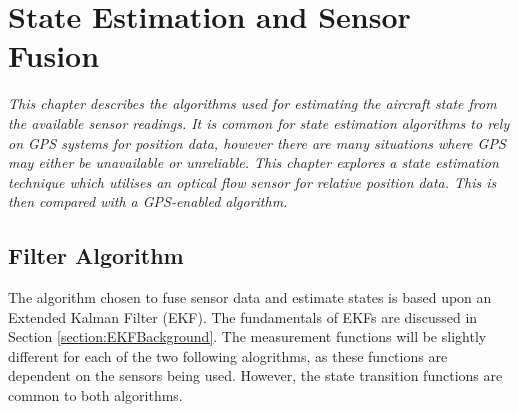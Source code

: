 
\chapter{State Estimation and Sensor Fusion}
\textit{This chapter describes the algorithms used for estimating the aircraft state from the available sensor readings. It is common for state estimation algorithms to rely on GPS systems for position data, however there are many situations where GPS may either be unavailable or unreliable. This chapter explores a state estimation technique which utilises an optical flow sensor for relative position data. This is then compared with a GPS-enabled algorithm.}

\section{Filter Algorithm}\label{section:Filter}
The algorithm chosen to fuse sensor data and estimate states is based upon an Extended Kalman Filter (EKF). The fundamentals of EKFs are discussed in Section \ref{section:EKFBackground}. The measurement functions will be slightly different for each of the two following alogrithms, as these functions are dependent on the sensors being used. However, the state transition functions are common to both algorithms.

